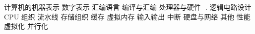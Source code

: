\markdownRendererUlBeginTight
\markdownRendererUlItem 计算机的机器表示\markdownRendererInterblockSeparator
{}\markdownRendererUlBeginTight
\markdownRendererUlItem 数字表示\markdownRendererUlItemEnd 
\markdownRendererUlItem 汇编语言\markdownRendererUlItemEnd 
\markdownRendererUlItem 编译与汇编\markdownRendererUlItemEnd 
\markdownRendererUlEndTight \markdownRendererUlItemEnd 
\markdownRendererUlItem 处理器与硬件 -. 逻辑电路设计\markdownRendererInterblockSeparator
{}\markdownRendererUlBeginTight
\markdownRendererUlItem CPU 组织\markdownRendererUlItemEnd 
\markdownRendererUlItem 流水线\markdownRendererUlItemEnd 
\markdownRendererUlEndTight \markdownRendererUlItemEnd 
\markdownRendererUlItem 存储组织\markdownRendererInterblockSeparator
{}\markdownRendererUlBeginTight
\markdownRendererUlItem 缓存\markdownRendererUlItemEnd 
\markdownRendererUlItem 虚拟内存\markdownRendererUlItemEnd 
\markdownRendererUlEndTight \markdownRendererUlItemEnd 
\markdownRendererUlItem 输入输出\markdownRendererInterblockSeparator
{}\markdownRendererUlBeginTight
\markdownRendererUlItem 中断\markdownRendererUlItemEnd 
\markdownRendererUlItem 硬盘与网络\markdownRendererUlItemEnd 
\markdownRendererUlEndTight \markdownRendererUlItemEnd 
\markdownRendererUlItem 其他\markdownRendererInterblockSeparator
{}\markdownRendererUlBeginTight
\markdownRendererUlItem 性能\markdownRendererUlItemEnd 
\markdownRendererUlItem 虚拟化\markdownRendererUlItemEnd 
\markdownRendererUlItem 并行化\markdownRendererUlItemEnd 
\markdownRendererUlEndTight \markdownRendererUlItemEnd 
\markdownRendererUlEndTight \relax